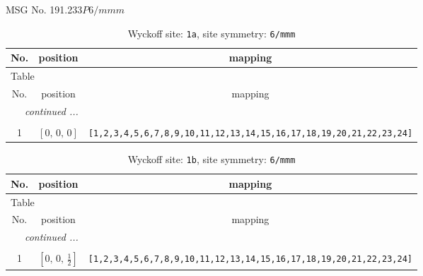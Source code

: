 \documentclass[fleqn,8pt]{jsarticle}
\begin{document}
\setcounter{MaxMatrixCols}{32}

\renewcommand{\tablename}{Table~}
\renewcommand{\figurename}{Figure~}
\begin{center}
\LARGE
MSG No. 191.233\quad$P6/mmm$
\end{center}
\renewcommand{\arraystretch}{1.2}
\begin{longtable}{ccc}
\caption{Wyckoff site: {\tt 1a}, site symmetry: {\tt 6/mmm}}
 \\
 \hline \hline
No. & position & mapping \\ \hline \endfirsthead

\multicolumn{2}{l}{\tablename\ \thetable{}} \\
 \hline \hline
No. & position & mapping \\ \hline \endhead

 \hline \hline
\multicolumn{2}{r}{\footnotesize\it continued ...} \\ \endfoot

 \hline \hline
\multicolumn{2}{r}{} \\ \endlastfoot

1 & $\left[ 0,\, 0,\, 0 \right]$ & {\tt [1,2,3,4,5,6,7,8,9,10,11,12,13,14,15,16,17,18,19,20,21,22,23,24]} \\
\end{longtable}
\renewcommand{\arraystretch}{1.2}
\begin{longtable}{ccc}
\caption{Wyckoff site: {\tt 1b}, site symmetry: {\tt 6/mmm}}
 \\
 \hline \hline
No. & position & mapping \\ \hline \endfirsthead

\multicolumn{2}{l}{\tablename\ \thetable{}} \\
 \hline \hline
No. & position & mapping \\ \hline \endhead

 \hline \hline
\multicolumn{2}{r}{\footnotesize\it continued ...} \\ \endfoot

 \hline \hline
\multicolumn{2}{r}{} \\ \endlastfoot

1 & $\left[ 0,\, 0,\, \frac{1}{2} \right]$ & {\tt [1,2,3,4,5,6,7,8,9,10,11,12,13,14,15,16,17,18,19,20,21,22,23,24]} \\
\end{longtable}
\renewcommand{\arraystretch}{1.2}
\end{document}
